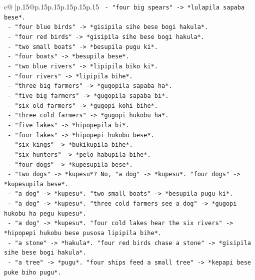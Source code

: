 \documentclass{article}
\begin{document}
{\begin{supertabular}{c@{$\;$}|p{.15\linewidth}@{}p{.15\linewidth}p{.15\linewidth}p{.15\linewidth}p{.15\linewidth}p{.15\linewidth}}
{{{\texttt{            {-} "four big spears" {-}> *lulapila sapaba bese*.} \\
\texttt{            {-} "four blue birds" {-}> *gisipila sihe bese bogi hakula*.} \\
\texttt{            {-} "four red birds" {-}> *gisipila sihe bese bogi hakula*.} \\
\texttt{            {-} "two small boats" {-}> *besupila pugu ki*.} \\
\texttt{            {-} "four boats" {-}> *besupila bese*.} \\
\texttt{            {-} "two blue rivers" {-}> *lipipila biko ki*.} \\
\texttt{            {-} "four rivers" {-}> *lipipila bihe*.} \\
\texttt{            {-} "three big farmers" {-}> *gugopila sapaba ha*.} \\
\texttt{            {-} "five big farmers" {-}> *gugopila sapaba bi*.} \\
\texttt{            {-} "six old farmers" {-}> *gugopi kohi bihe*.} \\
\texttt{            {-} "three cold farmers" {-}> *gugopi hukobu ha*.} \\
\texttt{            {-} "five lakes" {-}> *hipopepila bi*.} \\
\texttt{            {-} "four lakes" {-}> *hipopepi hukobu bese*.} \\
\texttt{            {-} "six kings" {-}> *bukikupila bihe*.} \\
\texttt{            {-} "six hunters" {-}> *pelo habupila bihe*.} \\
\texttt{            {-} "four dogs" {-}> *kupesupila bese*.} \\
\texttt{            {-} "two dogs" {-}> *kupesu*? No, "a dog" {-}> *kupesu*. "four dogs" {-}> *kupesupila bese*.} \\
\texttt{            {-} "a dog" {-}> *kupesu*. "two small boats" {-}> *besupila pugu ki*.} \\
\texttt{            {-} "a dog" {-}> *kupesu*. "three cold farmers see a dog" {-}> *gugopi hukobu ha pegu kupesu*.} \\
\texttt{            {-} "a dog" {-}> *kupesu*. "four cold lakes hear the six rivers" {-}> *hipopepi hukobu bese pusosa lipipila bihe*.} \\
\texttt{            {-} "a stone" {-}> *hakula*. "four red birds chase a stone" {-}> *gisipila sihe bese bogi hakula*.} \\
\texttt{            {-} "a tree" {-}> *pugu*. "four ships feed a small tree" {-}> *kepapi bese puke biho pugu*.} \\
}}}
\end{supertabular}}
\end{document}
